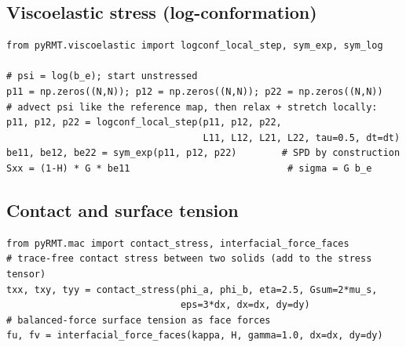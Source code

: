 \documentclass[11pt]{article}
\begin{document}
\subsection{Viscoelastic stress (log-conformation)}
\begin{lstlisting}
from pyRMT.viscoelastic import logconf_local_step, sym_exp, sym_log

# psi = log(b_e); start unstressed
p11 = np.zeros((N,N)); p12 = np.zeros((N,N)); p22 = np.zeros((N,N))
# advect psi like the reference map, then relax + stretch locally:
p11, p12, p22 = logconf_local_step(p11, p12, p22,
                                   L11, L12, L21, L22, tau=0.5, dt=dt)
be11, be12, be22 = sym_exp(p11, p12, p22)        # SPD by construction
Sxx = (1-H) * G * be11                            # sigma = G b_e
\end{lstlisting}

\subsection{Contact and surface tension}
\begin{lstlisting}
from pyRMT.mac import contact_stress, interfacial_force_faces
# trace-free contact stress between two solids (add to the stress tensor)
txx, txy, tyy = contact_stress(phi_a, phi_b, eta=2.5, Gsum=2*mu_s,
                               eps=3*dx, dx=dx, dy=dy)
# balanced-force surface tension as face forces
fu, fv = interfacial_force_faces(kappa, H, gamma=1.0, dx=dx, dy=dy)
\end{lstlisting}
\end{document}
